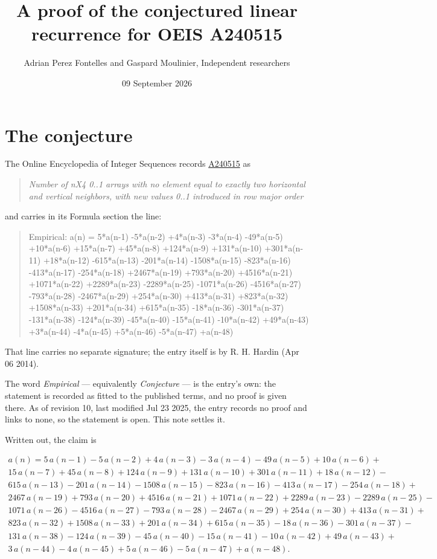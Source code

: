 \documentclass[11pt]{article}
\title{A proof of the conjectured linear recurrence for OEIS A240515}
\author{Adrian Perez Fontelles and Gaspard Moulinier, Independent researchers}
\date{09 September 2026}
\theoremstyle{definition}
\begin{document}
\maketitle
\section{The conjecture}

The Online Encyclopedia of Integer Sequences records \href{https://oeis.org/A240515}{A240515} as

\begin{quote}\itshape Number of nX4 0..1 arrays with no element equal to exactly two horizontal and vertical neighbors, with new values 0..1 introduced in row major order\end{quote}

and carries in its Formula section the line:

\begin{quote}\ttfamily Empirical: a(n) = 5*a(n-1) -5*a(n-2) +4*a(n-3) -3*a(n-4) -49*a(n-5) +10*a(n-6) +15*a(n-7) +45*a(n-8) +124*a(n-9) +131*a(n-10) +301*a(n-11) +18*a(n-12) -615*a(n-13) -201*a(n-14) -1508*a(n-15) -823*a(n-16) -413*a(n-17) -254*a(n-18) +2467*a(n-19) +793*a(n-20) +4516*a(n-21) +1071*a(n-22) +2289*a(n-23) -2289*a(n-25) -1071*a(n-26) -4516*a(n-27) -793*a(n-28) -2467*a(n-29) +254*a(n-30) +413*a(n-31) +823*a(n-32) +1508*a(n-33) +201*a(n-34) +615*a(n-35) -18*a(n-36) -301*a(n-37) -131*a(n-38) -124*a(n-39) -45*a(n-40) -15*a(n-41) -10*a(n-42) +49*a(n-43) +3*a(n-44) -4*a(n-45) +5*a(n-46) -5*a(n-47) +a(n-48)\end{quote}

That line carries no separate signature; the entry itself is by R. H. Hardin (Apr 06 2014).

The word {\itshape Empirical} --- equivalently {\itshape Conjecture} --- is the entry's own: the statement is recorded as fitted to the published terms, and no proof is given there. As of revision 10, last modified Jul 23 2025, the entry records no proof and links to none, so the statement is open. This note settles it.

Written out, the claim is

\begin{multline*} a(n) = 5\,a(n-1) - 5\,a(n-2) + 4\,a(n-3) - 3\,a(n-4) - 49\,a(n-5) + 10\,a(n-6) + \\ 15\,a(n-7) + 45\,a(n-8) + 124\,a(n-9) + 131\,a(n-10) + 301\,a(n-11) + 18\,a(n-12) - \\ 615\,a(n-13) - 201\,a(n-14) - 1508\,a(n-15) - 823\,a(n-16) - 413\,a(n-17) - 254\,a(n-18) + \\ 2467\,a(n-19) + 793\,a(n-20) + 4516\,a(n-21) + 1071\,a(n-22) + 2289\,a(n-23) - 2289\,a(n-25) - \\ 1071\,a(n-26) - 4516\,a(n-27) - 793\,a(n-28) - 2467\,a(n-29) + 254\,a(n-30) + 413\,a(n-31) + \\ 823\,a(n-32) + 1508\,a(n-33) + 201\,a(n-34) + 615\,a(n-35) - 18\,a(n-36) - 301\,a(n-37) - \\ 131\,a(n-38) - 124\,a(n-39) - 45\,a(n-40) - 15\,a(n-41) - 10\,a(n-42) + 49\,a(n-43) + \\ 3\,a(n-44) - 4\,a(n-45) + 5\,a(n-46) - 5\,a(n-47) + a(n-48). \end{multline*}
\end{document}
